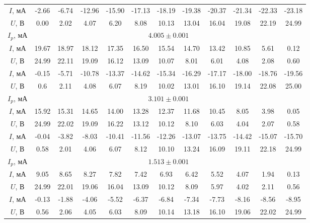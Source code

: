 \documentclass[a4paper, 12pt]{article}
\begin{document}
\begin{enumerate}
\begin{table}[htbp]
\begin{tabular}{|c|c|c|c|c|c|c|c|c|c|c|c|}
            \hline
            $I$, мА & -2.66 & -6.74 & -12.96 & -15.90 & -17.13 & -18.19 & -19.38 & -20.37 & -21.34 & -22.33 & -23.18\\
            $U$, В & 0.00 & 2.02 & 4.07 & 6.20 & 8.08 & 10.13 & 13.04 & 16.04 & 19.08 & 22.19 & 24.99\\
            \hline
            $I_{p}$, мА & \multicolumn{11}{|c|}{$4.005\pm 0.001$}\\
            \hline
            $I$, мА & 19.67 & 18.97 & 18.12 & 17.35 & 16.50 & 15.54 & 14.70 & 13.42 & 10.85 & 5.61 & 0.12\\
            $U$, В & 24.99 & 22.11 & 19.09 & 16.12 & 13.09 & 10.07 & 8.01 & 6.01 & 4.08 & 2.08 & 0.60\\
            \hline
            $I$, мА & -0.15 & -5.71 & -10.78 & -13.37 & -14.62 & -15.34 & -16.29 & -17.17 & -18.00 & -18.76 & -19.56\\
            $U$, В & 0.6 & 2.11 & 4.08 & 6.07 & 8.19 & 10.02 & 13.01 & 16.10 & 19.14 & 22.08 & 25.00\\
            \hline
            $I_{p}$, мА & \multicolumn{11}{|c|}{$3.101\pm 0.001$}\\
            \hline
            $I$, мА & 15.92 & 15.31 & 14.65 & 14.00 & 13.28 & 12.37 & 11.68 & 10.45 & 8.05 & 3.98 & 0.05\\
            $U$, В & 24.99 & 22.02 & 19.09 & 16.22 & 13.12 & 10.12 & 8.10 & 6.03 & 4.04 & 2.07 & 0.58\\
            \hline
            $I$, мА & -0.04 & -3.82 & -8.03 & -10.41 & -11.56 & -12.26 & -13.07 & -13.75 & -14.42 & -15.07 & -15.70\\
            $U$, В & 0.58 & 2.01 & 4.06 & 6.07 & 8.12 & 10.10 & 13.24 & 16.09 & 19.11 & 22.18 & 24.99\\
            \hline
            $I_{p}$, мА & \multicolumn{11}{|c|}{$1.513\pm 0.001$}\\
            \hline
            $I$, мА & 9.05 & 8.65 & 8.27 & 7.82 & 7.42 & 6.93 & 6.42 & 5.52 & 4.07 & 1.94 & 0.13\\
            $U$, В & 24.99 & 22.01 & 19.06 & 16.04 & 13.09 & 10.12 & 8.09 & 5.97 & 4.02 & 2.11 & 0.56\\
            \hline
            $I$, мА & -0.13 & -1.88 & -4.06 & -5.52 & -6.37 & -6.84 & -7.34 & -7.73 & -8.16 & -8.56 & -8.95\\
            $U$, В & 0.56 & 2.06 & 4.05 & 6.03 & 8.09 & 10.14 & 13.18 & 16.10 & 19.06 & 22.02 & 24.99\\
            \hline

\end{tabular}
\end{table}
\end{enumerate}
\end{document}
